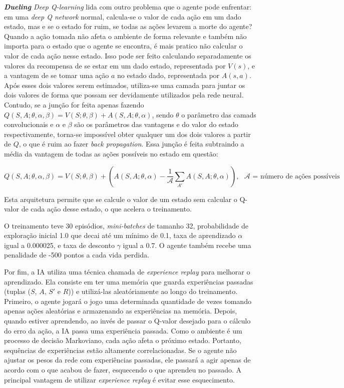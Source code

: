 \textit{\textbf{Dueling} Deep Q-learning} lida com outro problema que o agente pode enfrentar: em uma \textit{deep Q network} normal, calcula-se o valor de cada ação em um dado estado, mas e se o estado for ruim, se todas as ações levarem a morte do agente?
Quando a ação tomada não afeta o ambiente de forma relevante e também não importa para o estado que o agente se encontra, é mais pratico não calcular o valor de cada ação nesse estado.
Isso pode ser feito calculando separadamente os valores da recompensa de se estar em um dado estado, representada por $V(s)$, e a vantagem de se tomar uma ação $a$ no estado dado, representada por $A(s,a)$.
Após esses dois valores serem estimados, utiliza-se uma camada para juntar os dois valores de forma que possam ser devidamente utilizados pela rede neural.
Contudo, se a junção for feita apenas fazendo $Q(S, A;\theta, \alpha, \beta) = V(S; \theta, \beta) + A(S, A; \theta, \alpha)$, sendo $\theta$ o parâmetro das camads convolucionais e $\alpha$ e $\beta$ são os parâmetros das vantagens e do valor do estado respectivamente, torna-se impossível obter qualquer um dos dois valores a partir de $Q$, o que é ruim ao fazer \textit{back propagation}.
Essa junção é feita subtraindo a média da vantagem de todas as ações possíveis no estado em questão:

\begin{equation} \label{eq:duelingdqn}
Q(S,A;\theta,\alpha,\beta) = V(S;\theta,\beta) + (A(S,A;\theta,\alpha) - \frac{1}{\mathcal{A}}\sum_{A'}A(S,A;\theta,\alpha)), \text{ $\mathcal{A}$ = número de ações possíveis}
\end{equation}

Esta arquitetura permite que se calcule o valor de um estado sem calcular o Q-valor de cada ação desse estado, o que acelera o treinamento.

O treinamento teve 30 episódios, \textit{mini-batches} de tamanho 32, probabilidade de exploração inicial 1.0 que decai até um mínimo de 0.1, taxa de aprendizado $\alpha$ igual a 0.000025, e taxa de desconto $\gamma$ igual a 0.7. O agente também recebe uma penalidade de -500 pontos a cada vida perdida.

Por fim, a IA utiliza uma técnica chamada de \textit{experience replay} para melhorar o aprendizado. Ela consiste em ter uma memória que guarda experiências passadas (tuplas ($S$, $A$, $S'$ e $R$)) e utilizá-las aleatóriamente ao longo do treinamento.
Primeiro, o agente jogará o jogo uma determinada quantidade de vezes tomando apenas ações aleatórias e armazenando as experiências na memória.
Depois, quando estiver aprendendo, ao invés de passar o Q-valor desejado para o cálculo do erro da ação, a IA passa uma experiência passada.
Como o ambiente é um processo de decisão Markoviano, cada ação afeta o próximo estado. Portanto, sequências de experiências estão altamente correlacionadas. Se o agente não ajustar os pesos da rede com experiências passadas, ele passará a agir apenas de acordo com o que acabou de fazer, esquecendo o que aprendeu no passado.
A principal vantagem de utilizar \textit{experience replay} é evitar esse esquecimento.

